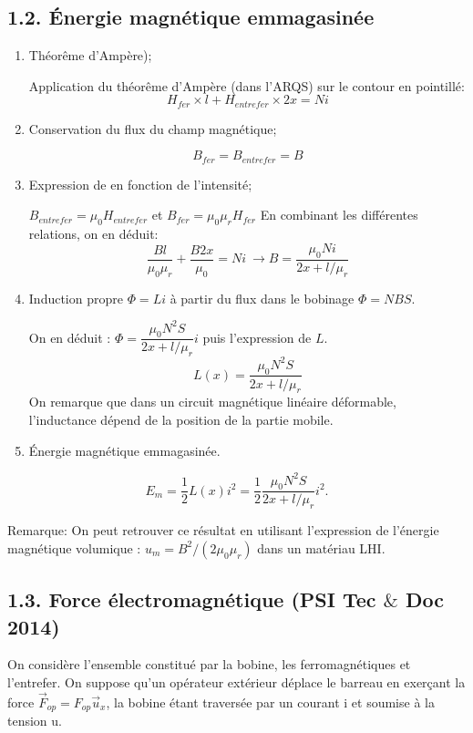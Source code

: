\documentclass[french, a4paper, 10pt, twocolumn, landscape]{article}
\begin{document}
\subsection*{1.2. Énergie magnétique emmagasinée}
\begin{enumerate}
    \item Théorême d'Ampère);

Application du théorême d'Ampère (dans l'ARQS) sur le contour en pointillé: 
\begin{equation}
	H_{fer}\times l + H_{entrefer}\times 2x = Ni
\end{equation}
	\item Conservation du flux du champ magnétique;
	
\begin{equation}
	B_{fer}=B_{entrefer}=B
\end{equation}

    \item Expression de  en fonction de l'intensité;

$B_{entrefer}=\mu_0 H_{entrefer}$ et $B_{fer} = \mu_0\mu_rH_{fer}$ En combinant les différentes relations, on en déduit: 
\begin{equation}
	\dfrac{Bl}{\mu_0\mu_r}+\dfrac{B2x}{\mu_0}=Ni\ \rightarrow B = \dfrac{\mu_0Ni}{2x+l/\mu_r}
\end{equation}

    \item Induction propre $\Phi=Li$ à partir du flux dans le bobinage $\Phi=NBS$.

On en déduit : $\Phi = \dfrac{\mu_0N^2S}{2x+l/\mu_r}i$ puis l'expression de $L$.
\begin{equation}
	L(x)=\dfrac{\mu_0N^2S}{2x+l/\mu_r}
\end{equation}
On remarque que dans un circuit magnétique linéaire déformable, l'inductance dépend de la position de la partie mobile.

    \item Énergie magnétique emmagasinée.
\end{enumerate}
\begin{equation}
	E_m = \dfrac{1}{2}L(x)i^2 = \dfrac{1}{2}\dfrac{\mu_0N^2S}{2x+l/\mu_r}i^2.
\end{equation}

Remarque: On peut retrouver ce résultat en utilisant l'expression de l'énergie magnétique volumique : $u_m=B^2/(2\mu_0\mu_r)$ dans un matériau LHI.

\subsection*{1.3. Force électromagnétique (PSI Tec $\&$ Doc 2014)}
On considère l'ensemble constitué par la bobine, les ferromagnétiques et l'entrefer. On suppose qu’un opérateur extérieur déplace le barreau en exerçant la force $\vec{F}_{op}=F_{op}\vec{u}_x$, la bobine
étant traversée par un courant i et soumise à la tension u.
\end{document}

